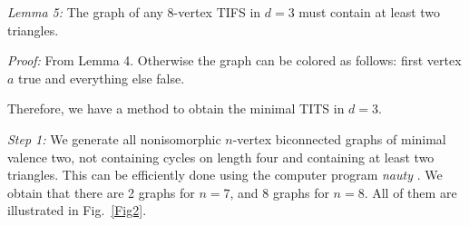 \documentclass[%
  twocolumn,
 showpacs,
 showkeys,
 preprintnumbers,
 amsmath,amssymb,
 aps,
  pra,
  longbibliography,
 floatfix,
 ]{revtex4-1}
\def\endproof{ }
\begin{document}

{\em Lemma 5:} The graph of any 8-vertex TIFS in $d=3$ must contain at least two triangles.


{\em Proof:} From Lemma 4. Otherwise the graph can be colored as follows: first vertex $a$ true and everything else false. \endproof


Therefore, we have a method to obtain the minimal TITS in $d=3$.

{\em Step 1:} We generate all nonisomorphic $n$-vertex biconnected graphs of minimal valence two,
not containing cycles on length four and containing at least two triangles.
This can be efficiently done using the computer program {\em nauty} \cite{code15}.
We obtain that there are 2 graphs for $n=7$, and 8 graphs for $n=8$. All of them are illustrated in Fig.~\ref{Fig2}.
\end{document}
